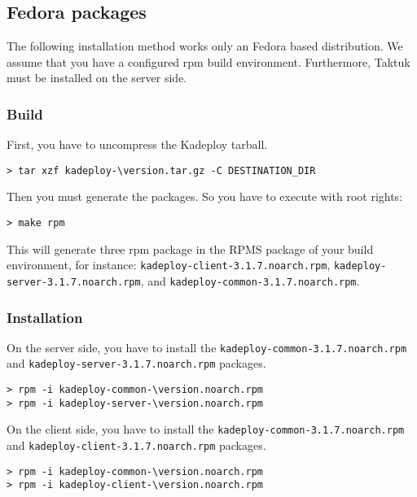 \documentclass[a4wide,10pt,oneside]{book}
\newcommand{\version}{3.1.7}
\begin{document}
\subsection{Fedora packages}
The following installation method works only an Fedora based distribution. We assume that you have a configured rpm build environment. Furthermore, Taktuk must be installed on the server side.
\subsubsection{Build}
\noindent First, you have to uncompress the Kadeploy tarball. 
\begin{small}
\begin{Verbatim}[commandchars=\\\{\}]
> tar xzf kadeploy-\version.tar.gz -C DESTINATION_DIR
\end{Verbatim}
\end{small}

\noindent Then you must generate the packages. So you have to execute with root rights:
\begin{small}
\begin{verbatim}
> make rpm
\end{verbatim}
\end{small}
This will generate three rpm package in the RPMS package of your build environment, for instance: \texttt{kadeploy-client-\version.noarch.rpm}, \texttt{kadeploy-server-\version.noarch.rpm}, and \texttt{kadeploy-common-\version.noarch.rpm}.
\subsubsection{Installation}
\noindent On the server side, you have to install the \texttt{kadeploy-common-\version.noarch.rpm} and \texttt{kadeploy-server-\version.noarch.rpm} packages.
\begin{small}
\begin{Verbatim}[commandchars=\\\{\}]
> rpm -i kadeploy-common-\version.noarch.rpm
> rpm -i kadeploy-server-\version.noarch.rpm
\end{Verbatim}
\end{small}

\noindent On the client side, you have to install the \texttt{kadeploy-common-\version.noarch.rpm} and \texttt{kadeploy-client-\version.noarch.rpm} packages.
\begin{small}
\begin{Verbatim}[commandchars=\\\{\}]
> rpm -i kadeploy-common-\version.noarch.rpm
> rpm -i kadeploy-client-\version.noarch.rpm
\end{Verbatim}
\end{small}
\end{document}

